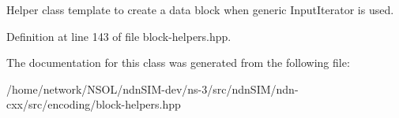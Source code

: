Helper class template to create a data block when generic Input\+Iterator is used. 

Definition at line 143 of file block-\/helpers.\+hpp.



The documentation for this class was generated from the following file\+:\begin{DoxyCompactItemize}
\item 
/home/network/\+N\+S\+O\+L/ndn\+S\+I\+M-\/dev/ns-\/3/src/ndn\+S\+I\+M/ndn-\/cxx/src/encoding/block-\/helpers.\+hpp\end{DoxyCompactItemize}
